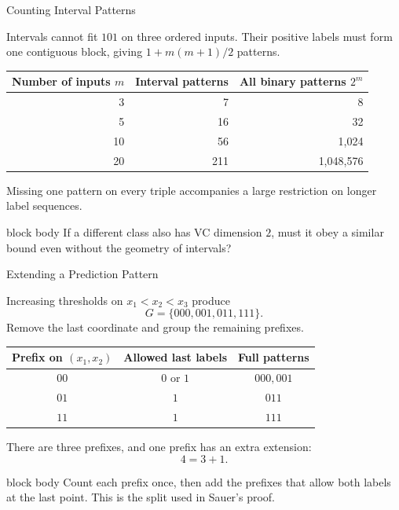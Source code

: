 \documentclass[aspectratio=169,10pt]{beamer}
\newcommand{\KeyBox}[1]{%
  \begin{beamercolorbox}[rounded=true,sep=0.22cm,wd=\linewidth]{block body}
    #1
  \end{beamercolorbox}%
}
\begin{document}
\begin{frame}[t]{Counting Interval Patterns}
  \vspace{0.04cm}
  \small

  Intervals cannot fit $101$ on three ordered inputs. Their positive labels
  must form one contiguous block, giving $1+m(m+1)/2$ patterns.
  \begin{center}
  \renewcommand{\arraystretch}{1.15}
  \begin{tabular}{r r r}
    \toprule
    Number of inputs $m$ & Interval patterns & All binary patterns $2^m$\\
    \midrule
    3 & 7 & 8\\
    5 & 16 & 32\\
    10 & 56 & 1,024\\
    20 & 211 & 1,048,576\\
    \bottomrule
  \end{tabular}
  \end{center}
  Missing one pattern on every triple accompanies a large restriction on
  longer label sequences.
  \vspace{0.15cm}
  \KeyBox{If a different class also has VC dimension $2$, must it obey a
  similar bound even without the geometry of intervals?}

\end{frame}

\begin{frame}[t]{Extending a Prediction Pattern}
  \vspace{0.04cm}
  \small

  Increasing thresholds on $x_1<x_2<x_3$ produce
  \[
    G=\{000,001,011,111\}.
  \]
  Remove the last coordinate and group the remaining prefixes.
  \begin{center}
  \renewcommand{\arraystretch}{1.15}
  \begin{tabular}{ccc}
    \toprule
    Prefix on $(x_1,x_2)$ & Allowed last labels & Full patterns\\
    \midrule
    $00$ & $0$ or $1$ & $000,001$\\
    $01$ & $1$ & $011$\\
    $11$ & $1$ & $111$\\
    \bottomrule
  \end{tabular}
  \end{center}
  There are three prefixes, and one prefix has an extra extension:
  \[
    4=3+1.
  \]
  \KeyBox{Count each prefix once, then add the prefixes that allow both
  labels at the last point. This is the split used in Sauer's proof.}

\end{frame}
\end{document}
